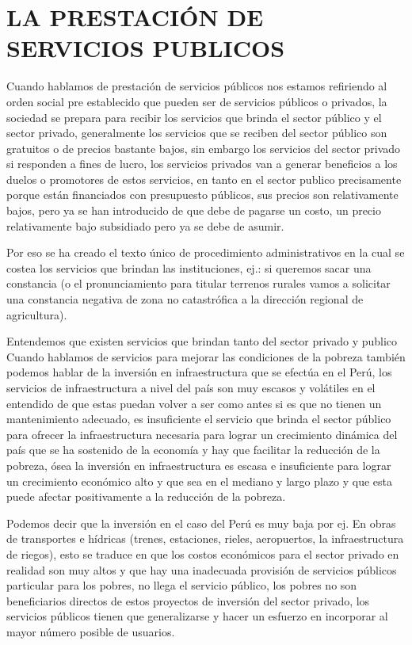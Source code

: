 \documentclass[
  a4paper,
]{article}
\begin{document}
\hypertarget{la-prestaciuxf3n-de-servicios-publicos}{%
\section{LA PRESTACIÓN DE SERVICIOS
PUBLICOS}\label{la-prestaciuxf3n-de-servicios-publicos}}

Cuando hablamos de prestación de servicios públicos nos estamos
refiriendo al orden social pre establecido que pueden ser de servicios
públicos o privados, la sociedad se prepara para recibir los servicios
que brinda el sector público y el sector privado, generalmente los
servicios que se reciben del sector público son gratuitos o de precios
bastante bajos, sin embargo los servicios del sector privado si
responden a fines de lucro, los servicios privados van a generar
beneficios a los duelos o promotores de estos servicios, en tanto en el
sector publico precisamente porque están financiados con presupuesto
públicos, sus precios son relativamente bajos, pero ya se han
introducido de que debe de pagarse un costo, un precio relativamente
bajo subsidiado pero ya se debe de asumir.

Por eso se ha creado el texto único de procedimiento administrativos en
la cual se costea los servicios que brindan las instituciones, ej.: si
queremos sacar una constancia (o el pronunciamiento para titular
terrenos rurales vamos a solicitar una constancia negativa de zona no
catastrófica a la dirección regional de agricultura).

Entendemos que existen servicios que brindan tanto del sector privado y
publico Cuando hablamos de servicios para mejorar las condiciones de la
pobreza también podemos hablar de la inversión en infraestructura que se
efectúa en el Perú, los servicios de infraestructura a nivel del país
son muy escasos y volátiles en el entendido de que estas puedan volver a
ser como antes si es que no tienen un mantenimiento adecuado, es
insuficiente el servicio que brinda el sector público para ofrecer la
infraestructura necesaria para lograr un crecimiento dinámica del país
que se ha sostenido de la economía y hay que facilitar la reducción de
la pobreza, ósea la inversión en infraestructura es escasa e
insuficiente para lograr un crecimiento económico alto y que sea en el
mediano y largo plazo y que esta puede afectar positivamente a la
reducción de la pobreza.

Podemos decir que la inversión en el caso del Perú es muy baja por ej.
En obras de transportes e hídricas (trenes, estaciones, rieles,
aeropuertos, la infraestructura de riegos), esto se traduce en que los
costos económicos para el sector privado en realidad son muy altos y que
hay una inadecuada provisión de servicios públicos particular para los
pobres, no llega el servicio público, los pobres no son beneficiarios
directos de estos proyectos de inversión del sector privado, los
servicios públicos tienen que generalizarse y hacer un esfuerzo en
incorporar al mayor número posible de usuarios.
\end{document}
